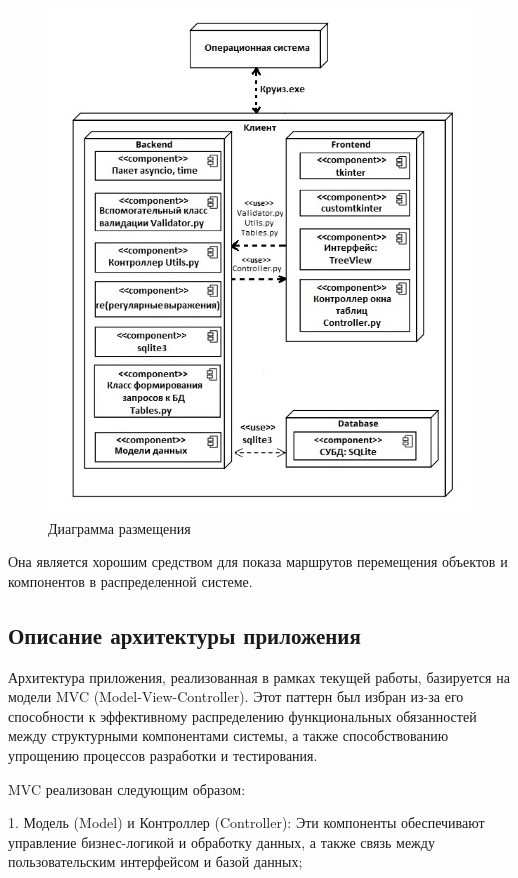 \begin{figure} [ht]
	\centering
	\includegraphics[width=1\linewidth]{images/CommonScheme4}
	\caption{Диаграмма размещения}
	\label{fig:commonscheme4}
\end{figure}
Она является хорошим средством для показа маршрутов перемещения объектов и компонентов в распределенной системе.

\subsection{Описание архитектуры приложения}

Архитектура приложения, реализованная в рамках текущей работы, базируется на модели MVC (Model-View-Controller). Этот паттерн был избран из-за его способности к эффективному распределению функциональных обязанностей между структурными компонентами системы, а также способствованию упрощению процессов разработки и тестирования.

MVC реализован следующим образом:

1. Модель (Model) и Контроллер (Controller): Эти компоненты обеспечивают управление бизнес-логикой и обработку данных, а также связь между пользовательским интерфейсом и базой данных;

